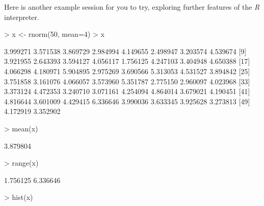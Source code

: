\documentclass[10pt,letterpaper]{article}
\newenvironment{Schunk}{}{}
\begin{document}
Here is another example session for you to try, exploring further features of the \emph{R} interpreter.

\begin{Schunk}
\begin{Sinput}
> x <- rnorm(50, mean=4)
> x
\end{Sinput}
\begin{Soutput}
 [1] 3.999271 3.571538 3.869729 2.984994 4.149655 2.498947 3.203574 4.539674
 [9] 3.921955 2.643393 3.594127 4.056117 1.756125 4.247103 3.404948 4.650388
[17] 4.066298 4.180971 5.904895 2.975269 3.690566 5.313053 4.531527 3.894842
[25] 3.751858 3.161076 4.066057 3.573960 5.351787 2.775150 2.960097 4.023968
[33] 3.373124 4.472353 3.240710 3.071161 4.254094 4.864014 3.679021 4.190451
[41] 4.816644 3.601009 4.429415 6.336646 3.990036 3.633345 3.925628 3.273813
[49] 4.172919 3.352902
\end{Soutput}
\begin{Sinput}
> mean(x)
\end{Sinput}
\begin{Soutput}
[1] 3.879804
\end{Soutput}
\begin{Sinput}
> range(x)
\end{Sinput}
\begin{Soutput}
[1] 1.756125 6.336646
\end{Soutput}
\begin{Sinput}
> hist(x)
\end{Sinput}
\end{Schunk}
\end{document}

